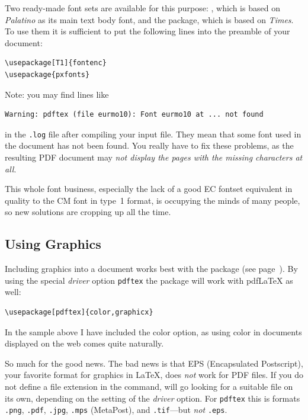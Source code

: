 Two ready-made font sets are available for this purpose:
, which is based on \emph{Palatino} as its main text body font,
and the  package, which is based on \emph{Times}. To use them it is
sufficient to put the following lines into the preamble of your
document:
\begin{code}
\begin{verbatim}
\usepackage[T1]{fontenc}
\usepackage{pxfonts}
\end{verbatim}
\end{code}

Note: you may find lines like
\begin{verbatim}
Warning: pdftex (file eurmo10): Font eurmo10 at ... not found
\end{verbatim}
in the  \texttt{.log} file after compiling your input file. They mean
that some font used in the document has not been found. You really have
to fix these problems, as the resulting PDF document may 
\emph{not display the pages with the missing characters at all}.

This whole font business, especially the lack of a good EC fontset 
equivalent in quality to the CM font in type~1 format,  is occupying the 
minds of many people, so new solutions are cropping up all the time.
\subsection{Using Graphics}
\label{ssec:pdfgraph}

Including graphics into a document works best with the 
 package (see page~\pageref{eps}). 
By using the special \emph{driver} option \texttt{pdftex} the
package will work with pdf\LaTeX{} as well:
\begin{code}
\begin{verbatim}
\usepackage[pdftex]{color,graphicx}
\end{verbatim}
\end{code}
In the sample above I have included the color option, as using color in
documents displayed on the web comes quite naturally.

So much for the good news. The bad news is that EPS (Encapsulated Postscript), your favorite format
for graphics in \LaTeX{}, does
\emph{not} work for PDF files. If you do not define a file extension
in the  command,  will go
looking for a suitable file on its own, depending on the setting of
the \emph{driver} option. For \texttt{pdftex} this is
formats \texttt{.png}, \texttt{.pdf}, \texttt{.jpg}, \texttt{.mps} (MetaPost),
and \texttt{.tif}---but \emph{not} \texttt{.eps}.

